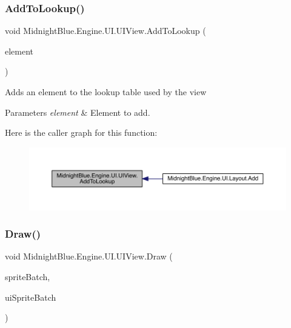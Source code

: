 \subsubsection{\texorpdfstring{Add\+To\+Lookup()}{AddToLookup()}}
{\footnotesize\ttfamily void Midnight\+Blue.\+Engine.\+U\+I.\+U\+I\+View.\+Add\+To\+Lookup (\begin{DoxyParamCaption}\item[{\hyperlink{class_midnight_blue_1_1_engine_1_1_u_i_1_1_u_i_element}{U\+I\+Element}}]{element }\end{DoxyParamCaption})\hspace{0.3cm}{\ttfamily [inline]}}



Adds an element to the lookup table used by the view 


\begin{DoxyParams}{Parameters}
{\em element} & Element to add.\\
\hline
\end{DoxyParams}
Here is the caller graph for this function\+:
\nopagebreak
\begin{figure}[H]
\begin{center}
\leavevmode
\includegraphics[width=350pt]{class_midnight_blue_1_1_engine_1_1_u_i_1_1_u_i_view_a1f5a8d988b464af5c207b75e0422abc6_icgraph}
\end{center}
\end{figure}
\hypertarget{class_midnight_blue_1_1_engine_1_1_u_i_1_1_u_i_view_a167c98165d6ed4031b371c6a92b95a1e}{}\label{class_midnight_blue_1_1_engine_1_1_u_i_1_1_u_i_view_a167c98165d6ed4031b371c6a92b95a1e} 
\subsubsection{\texorpdfstring{Draw()}{Draw()}}
{\footnotesize\ttfamily void Midnight\+Blue.\+Engine.\+U\+I.\+U\+I\+View.\+Draw (\begin{DoxyParamCaption}\item[{Sprite\+Batch}]{sprite\+Batch,  }\item[{Sprite\+Batch}]{ui\+Sprite\+Batch }\end{DoxyParamCaption})\hspace{0.3cm}{\ttfamily [inline]}}



